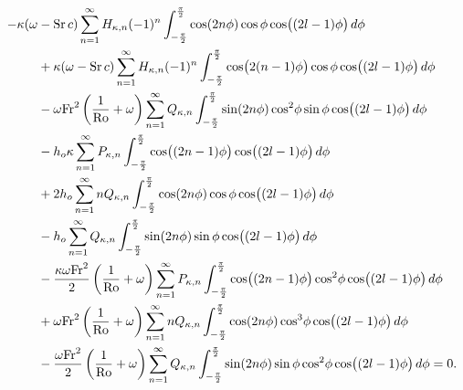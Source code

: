 \begin{align}
-\kappa(\omega &- \mathrm{Sr}\,c) \sum_{n=1}^\infty H_{\kappa,n} (-1)^n \int_{-\frac{\pi}{2}}^{\frac{\pi}{2}} \cos(2n\phi)\cos\phi\cos\bigl((2l-1)\phi\bigr)\,d\phi \notag \\
&+\kappa(\omega - \mathrm{Sr}\,c) \sum_{n=1}^\infty H_{\kappa,n} (-1)^n \int_{-\frac{\pi}{2}}^{\frac{\pi}{2}}\cos\bigl(2(n-1)\phi\bigr)\cos\phi\cos\bigl((2l-1)\phi\bigr)\,d\phi \notag \\
&- \omega \mathrm{Fr}^2 \left( \frac{1}{\mathrm{Ro}}+\omega \right)\sum_{n=1}^\infty Q_{\kappa,n} \int_{-\frac{\pi}{2}}^{\frac{\pi}{2}}\sin(2n\phi)\cos^2\!\phi \sin\phi\cos\bigl((2l-1)\phi\bigr)\,d\phi  \notag \\
&-h_o \kappa \sum_{n=1}^\infty P_{\kappa,n}\int_{-\frac{\pi}{2}}^{\frac{\pi}{2}} \cos\bigl((2n-1)\phi\bigr)\cos\bigl((2l-1)\phi\bigr)\,d\phi \notag\\
&+2h_o\sum_{n=1}^\infty n Q_{\kappa,n} \int_{-\frac{\pi}{2}}^{\frac{\pi}{2}} \cos(2n\phi)\cos\phi\cos\bigl((2l-1)\phi\bigr)\,d\phi \notag \\
&-h_o\sum_{n=1}^\infty Q_{\kappa,n} \int_{-\frac{\pi}{2}}^{\frac{\pi}{2}} \sin(2n\phi)\sin\phi \cos\bigl((2l-1)\phi\bigr)\,d\phi  \notag \\
&-\frac{\kappa \omega \mathrm{Fr}^2}{2}\left(\frac{1}{\mathrm{Ro}}+\omega \right)\sum_{n=1}^\infty P_{\kappa,n} \int_{-\frac{\pi}{2}}^{\frac{\pi}{2}} \cos\bigl((2n-1)\phi\bigr)\cos^2\!\phi \cos\bigl((2l-1)\phi\bigr)\,d\phi \notag \\
&+\omega \mathrm{Fr}^2\left(\frac{1}{\mathrm{Ro}}+\omega \right)\sum_{n=1}^\infty n Q_{\kappa,n} \int_{-\frac{\pi}{2}}^{\frac{\pi}{2}} \cos(2n\phi)\cos^3\!\phi \cos\bigl((2l-1)\phi\bigr)\,d\phi \notag \\
&-\frac{\omega \mathrm{Fr}^2}{2}\left(\frac{1}{\mathrm{Ro}}+\omega \right)\sum_{n=1}^\infty Q_{\kappa,n} \int_{-\frac{\pi}{2}}^{\frac{\pi}{2}} \sin(2n\phi)\sin\phi\cos^2\!\phi \cos\bigl((2l-1)\phi\bigr)\,d\phi=0. \label{eq:massint1}
\end{align}

